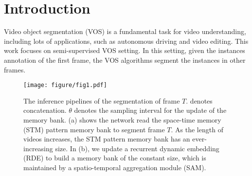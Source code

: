 \documentclass[10pt,twocolumn,letterpaper]{article}
\begin{document}
\section{Introduction\label{sec:intro}}
Video object segmentation (VOS) is a fundamental task for video understanding, including lots of applications, such as autonomous driving and video editing. This work focuses on semi-supervised VOS setting. In this setting, given the instances annotation of the first frame, the VOS algorithms segment the instances in other frames.

\begin{figure}[t]
\centering \texttt{[image: figure/fig1.pdf]}
\vspace{-.3em}
\caption{The inference pipelines of the segmentation of frame $T$. \raisebox{.4pt}{\textcircled{\raisebox{-.8pt} {c}}} denotes concatenation. $\theta$ denotes the sampling interval for the update of the memory bank. (a) shows the network read the space-time memory (STM) pattern memory bank to segment frame $T$. As the length of videos increases, the STM pattern memory bank has an ever-increasing size. In (b), we update a recurrent dynamic embedding (RDE) to build a memory bank of the constant size, which is maintained by a spatio-temporal aggregation module (SAM).}
\label{fig:fig1}
\vspace{-1em}
\end{figure}
\end{document}
